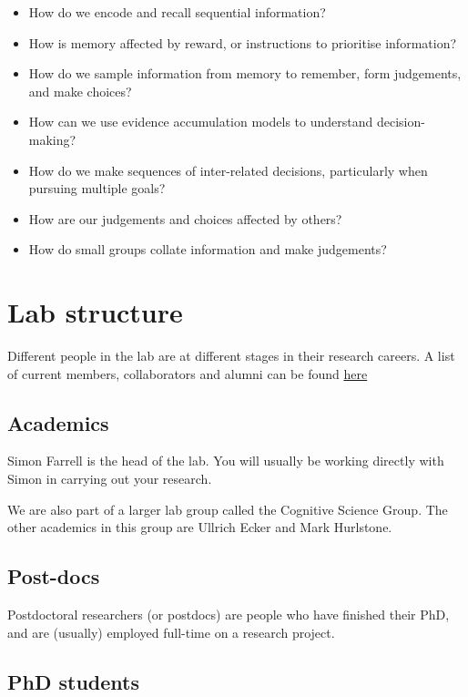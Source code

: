 \documentclass[]{book}
\providecommand{\tightlist}{%
  \setlength{\itemsep}{0pt}\setlength{\parskip}{0pt}}
\theoremstyle{definition}
\theoremstyle{definition}
\theoremstyle{definition}
\theoremstyle{remark}
\begin{document}
\begin{itemize}
\tightlist
\item
  How do we encode and recall sequential information?
\item
  How is memory affected by reward, or instructions to prioritise
  information?
\item
  How do we sample information from memory to remember, form judgements,
  and make choices?
\item
  How can we use evidence accumulation models to understand
  decision-making?
\item
  How do we make sequences of inter-related decisions, particularly when
  pursuing multiple goals?
\item
  How are our judgements and choices affected by others?
\item
  How do small groups collate information and make judgements?
\end{itemize}

\hypertarget{lab-structure}{%
\section{Lab structure}\label{lab-structure}}

Different people in the lab are at different stages in their research
careers. A list of current members, collaborators and alumni can be
found \href{link}{here}

\hypertarget{academics}{%
\subsection{Academics}\label{academics}}

Simon Farrell is the head of the lab. You will usually be working
directly with Simon in carrying out your research.

We are also part of a larger lab group called the Cognitive Science
Group. The other academics in this group are Ullrich Ecker and Mark
Hurlstone.

\hypertarget{post-docs}{%
\subsection{Post-docs}\label{post-docs}}

Postdoctoral researchers (or postdocs) are people who have finished
their PhD, and are (usually) employed full-time on a research project.

\hypertarget{phd-students}{%
\subsection{PhD students}\label{phd-students}}
\end{document}
